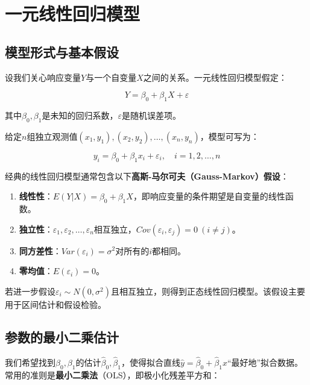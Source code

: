 \documentclass[
]{book}
\providecommand{\tightlist}{%
  \setlength{\itemsep}{0pt}\setlength{\parskip}{0pt}}
\begin{document}
\section{一元线性回归模型}\label{ux4e00ux5143ux7ebfux6027ux56deux5f52ux6a21ux578b}

\subsection{模型形式与基本假设}\label{ux6a21ux578bux5f62ux5f0fux4e0eux57faux672cux5047ux8bbe}

设我们关心响应变量\(Y\)与一个自变量\(X\)之间的关系。一元线性回归模型假定：

\[
Y = \beta_0 + \beta_1 X + \varepsilon
\]

其中\(\beta_0, \beta_1\)是未知的回归系数，\(\varepsilon\)是随机误差项。

给定\(n\)组独立观测值\((x_1, y_1), (x_2, y_2), \ldots, (x_n, y_n)\)，模型可写为：

\[
y_i = \beta_0 + \beta_1 x_i + \varepsilon_i, \quad i = 1, 2, \ldots, n
\]

经典的线性回归模型通常包含以下\textbf{高斯-马尔可夫（Gauss-Markov）假设}：

\begin{enumerate}
\def\labelenumi{\arabic{enumi}.}
\tightlist
\item
  \textbf{线性性}：\(E(Y|X) = \beta_0 + \beta_1 X\)，即响应变量的条件期望是自变量的线性函数。
\item
  \textbf{独立性}：\(\varepsilon_1, \varepsilon_2, \ldots, \varepsilon_n\)相互独立，\(Cov(\varepsilon_i, \varepsilon_j) = 0 \ (i \neq j)\)。
\item
  \textbf{同方差性}：\(Var(\varepsilon_i) = \sigma^2\)对所有的\(i\)都相同。
\item
  \textbf{零均值}：\(E(\varepsilon_i) = 0\)。
\end{enumerate}

若进一步假设\(\varepsilon_i \sim N(0, \sigma^2)\)且相互独立，则得到正态线性回归模型。该假设主要用于区间估计和假设检验。

\subsection{参数的最小二乘估计}\label{ux53c2ux6570ux7684ux6700ux5c0fux4e8cux4e58ux4f30ux8ba1}

我们希望找到\(\beta_0, \beta_1\)的估计\(\hat{\beta}_0, \hat{\beta}_1\)，使得拟合直线\(\hat{y} = \hat{\beta}_0 + \hat{\beta}_1 x\)``最好地''拟合数据。常用的准则是\textbf{最小二乘法}（OLS），即极小化残差平方和：
\end{document}
